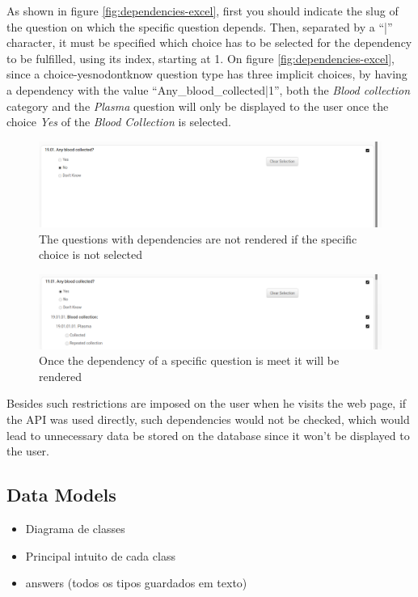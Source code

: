 As shown in figure \ref{fig:dependencies-excel}, first you should indicate the slug of the question on which the specific question depends.
Then, separated by a ``|'' character, it must be specified which choice has to be selected for the dependency to be fulfilled, using its index, starting at 1.
On figure \ref{fig:dependencies-excel}, since a choice-yesnodontknow question type has three implicit choices, by having a dependency with the value ``Any\_blood\_collected|1'', both the \textit{Blood collection} category and the \textit{Plasma} question will only be displayed to the user once the choice \textit{Yes} of the \textit{Blood Collection} is selected.

\begin{figure}[h]
    \center
    \includegraphics[width=0.75\linewidth]{dependencies-no}
    \caption{The questions with dependencies are not rendered if the specific choice is not selected}
    \label{fig:dependencies-no}
\end{figure}

\begin{figure}[h]
    \center
    \includegraphics[width=0.75\linewidth]{dependencies-yes}
    \caption{Once the dependency of a specific question is meet it will be rendered}
    \label{fig:dependencies-yes}
\end{figure}

Besides such restrictions are imposed on the user when he visits the web page, if the API was used directly, such dependencies would not be checked, which would lead to unnecessary data be stored on the database since it won't be displayed to the user.

\subsection{Data Models}
\begin{itemize}
    \item Diagrama de classes
    \item Principal intuito de cada class
    \item answers (todos os tipos guardados em texto)
\end{itemize}

